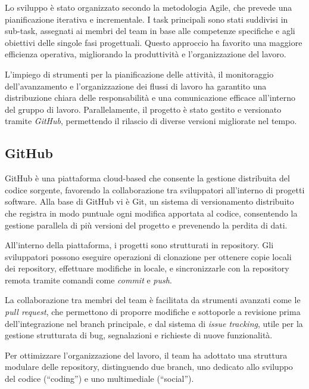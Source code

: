 \documentclass{optica-article}
\begin{document}
\begin{abstract*}
Lo sviluppo è stato organizzato secondo la metodologia Agile, che prevede una pianificazione iterativa e incrementale. I task principali sono stati suddivisi in sub-task, assegnati ai membri del team in base alle competenze specifiche e agli obiettivi delle singole fasi progettuali. Questo approccio ha favorito una maggiore efficienza operativa, migliorando la produttività e l'organizzazione del lavoro.

L’impiego di strumenti per la pianificazione delle attività, il monitoraggio dell’avanzamento e l’organizzazione dei flussi di lavoro ha garantito una distribuzione chiara delle responsabilità e una comunicazione efficace all’interno del gruppo di lavoro.  
Parallelamente, il progetto è stato gestito e versionato tramite \textit{GitHub}, permettendo il rilascio di diverse versioni migliorate nel tempo. 

\subsection{GitHub}
GitHub è una piattaforma cloud-based che consente la gestione distribuita del codice sorgente, favorendo la collaborazione tra sviluppatori all’interno di progetti software. Alla base di GitHub vi è Git, un sistema di versionamento distribuito che registra in modo puntuale ogni modifica apportata al codice, consentendo la gestione parallela di più versioni del progetto e prevenendo la perdita di dati.

All’interno della piattaforma, i progetti sono strutturati in repository. Gli sviluppatori possono eseguire operazioni di clonazione per ottenere copie locali dei repository, effettuare modifiche in locale, e sincronizzarle con la repository remota tramite comandi come \emph{commit} e \emph{push}.

La collaborazione tra membri del team è facilitata da strumenti avanzati come le \emph{pull request}, che permettono di proporre modifiche e sottoporle a revisione prima dell’integrazione nel branch principale, e dal sistema di \emph{issue tracking}, utile per la gestione strutturata di bug, segnalazioni e richieste di nuove funzionalità.

Per ottimizzare l'organizzazione del lavoro, il team ha adottato una struttura modulare delle repository, distinguendo due branch, uno dedicato allo sviluppo del codice (“coding”) e uno multimediale (“social”).


\end{abstract*}
\end{document}
